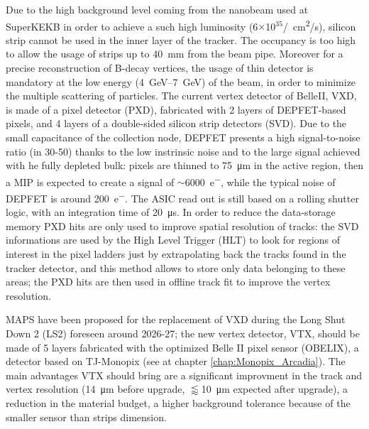         Due to the high background level coming from the nanobeam used at SuperKEKB in order to achieve a such high luminosity (6$\times$10$^{35}$\si{/cm\squared/s}), silicon strip cannot be used in the inner layer of the tracker. The occupancy is too high to allow the usage of strips up to \SI{40}{mm} from the beam pipe. 
        Moreover for a precise reconstruction of B-decay vertices, the usage of thin detector is mandatory at the low energy (\SIrange{4}{7}{GeV}) of the beam, in order to minimize the multiple scattering of particles. 
        The current vertex detector of BelleII, VXD, is made of a pixel detector (PXD), fabricated with 2 layers of DEPFET-based pixels, and 4 layers of a double-sided silicon strip detectors (SVD)\cite{BelleII-DEPFET}.
        Due to the small capacitance of the collection node, DEPFET presents a high signal-to-noise ratio (in 30-50) thanks to the low instrinsic noise and to the large signal achieved with he fully depleted bulk: pixels are thinned to \SI{75}{\um} in the active region, then a MIP is expected to create a signal of $\sim$\SI{6000}{e^-}, while the typical noise of DEPFET is around \SI{200}{e^-}.
        The ASIC read out is still based on a rolling shutter logic, with an integration time of \SI{20}{\us}.
        In order to reduce the data-storage memory PXD hits are only used to improve spatial resolution of tracks: the SVD informations are used by the High Level Trigger (HLT) to look for regions of interest in the pixel ladders just by extrapolating back the tracks found in the tracker detector, and this method allows to store only data belonging to these areas; the PXD hits are then used in offline track fit to improve the vertex resolution.
        
        MAPS have been proposed for the replacement of VXD during the  Long Shut Down 2 (LS2) foreseen around 2026-27; the new vertex detector, VTX, should be made of 5 layers fabricated with the optimized Belle II pixel sensor (OBELIX), a detector based on TJ-Monopix (see at chapter \ref{chap:Monopix_Arcadia}).    
        The main advantages VTX should bring are a significant improvment in the track and vertex resolution (\SI{14}{\um} before upgrade, $\lessapprox$\SI{10}{\um} expected after upgrade), a reduction in the material budget, a higher background tolerance because of the smaller sensor than strips dimension.

